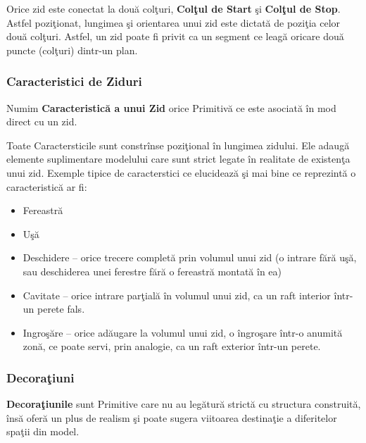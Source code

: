 Orice zid este conectat la două colţuri, \textbf{Colţul de Start} şi 
\textbf{Colţul de Stop}. Astfel poziţionat, lungimea şi orientarea unui zid 
este dictată de poziţia celor două colţuri. Astfel, un zid poate fi privit ca 
un segment ce leagă oricare două puncte (colţuri) dintr-un plan.

\subsubsection{Caracteristici de Ziduri}
\label{section:features}

\begin{definition}
\label{define:feature}
Numim \textbf{Caracteristică a unui Zid} orice Primitivă ce este asociată în 
mod direct cu un zid.
\end{definition}

Toate Caractersticile sunt constrînse poziţional în lungimea zidului. Ele 
adaugă elemente suplimentare modelului care sunt strict legate în realitate de 
existenţa unui zid. Exemple tipice de caracterstici ce elucidează şi mai bine 
ce reprezintă o caracteristică ar fi:

\begin{itemize}
  \item Fereastră
  \item Uşă
  \item Deschidere -- orice trecere completă prin volumul unui zid (o intrare 
  fără uşă, sau deschiderea unei ferestre fără o fereastră montată în ea)
  \item Cavitate -- orice intrare parţială în volumul unui zid, ca un raft 
  interior într-un perete fals.
  \item Ingroşăre -- orice adăugare la volumul unui zid, o îngroşare într-o 
  anumită zonă, ce poate servi, prin analogie, ca un raft exterior într-un 
  perete.
\end{itemize}
  
\subsubsection{Decoraţiuni}
  
\begin{definition}
\label{define:decoration}
\textbf{Decoraţiunile} sunt Primitive care nu au legătură strictă cu structura 
construită, însă oferă un plus de realism şi poate sugera viitoarea destinaţie 
a diferitelor spaţii din model.
\end{definition}
  

